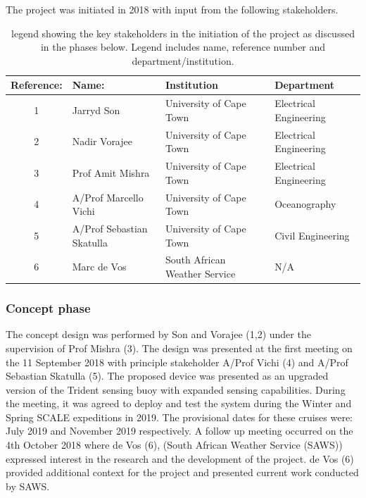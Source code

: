 The project was initiated in 2018 with input from the following stakeholders.
\begin{table}[H]
    \centering
    \caption{legend showing the key stakeholders in the initiation of the project as discussed in the phases below. Legend includes name, reference number and department/institution. }
    \label{tab:proj_init_members}
    \begin{tabular}{||c|l|l|l||}
    \hline
        \textbf{Reference:} & \textbf{Name:} & \textbf{Institution} & \textbf{Department}  \\
        \hline
        1 & Jarryd Son & University of Cape Town & Electrical Engineering \\
        \hline
        2 & Nadir Vorajee & University of Cape Town & Electrical Engineering \\
        \hline
        3 & Prof Amit Mishra & University of Cape Town & Electrical Engineering \\
        \hline
        4 & A/Prof Marcello Vichi & University of Cape Town & Oceanography \\
        \hline
        5 & A/Prof Sebastian Skatulla & University of Cape Town & Civil Engineering\\
        \hline
        6 & Marc de Vos & South African Weather Service & N/A \\
        \hline
    \end{tabular}

\end{table}

\subsubsection{Concept phase}

The concept design was performed by Son and Vorajee (1,2) under the supervision of Prof Mishra (3). The design was presented at the first meeting on the 11 September 2018 with principle stakeholder A/Prof Vichi (4) and A/Prof Sebastian Skatulla (5). The proposed device was presented as an upgraded version of the Trident sensing buoy with expanded sensing capabilities. During the meeting, it was agreed to deploy and test the system during the Winter and Spring SCALE expeditions in 2019. The provisional dates for these cruises were: July 2019 and November 2019 respectively. A follow up meeting occurred on the 4th October 2018 where de Vos (6), (South African Weather Service (SAWS)) expressed interest in the research and the development of the project. de Vos (6) provided additional context for the project and presented current work conducted by SAWS.

